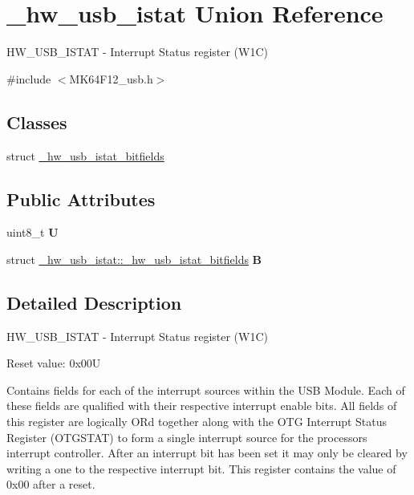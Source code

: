 \hypertarget{union__hw__usb__istat}{}\section{\+\_\+hw\+\_\+usb\+\_\+istat Union Reference}
\label{union__hw__usb__istat}


H\+W\+\_\+\+U\+S\+B\+\_\+\+I\+S\+T\+AT -\/ Interrupt Status register (W1C)  




{\ttfamily \#include $<$M\+K64\+F12\+\_\+usb.\+h$>$}

\subsection*{Classes}
\begin{DoxyCompactItemize}
\item 
struct \hyperlink{struct__hw__usb__istat_1_1__hw__usb__istat__bitfields}{\+\_\+hw\+\_\+usb\+\_\+istat\+\_\+bitfields}
\end{DoxyCompactItemize}
\subsection*{Public Attributes}
\begin{DoxyCompactItemize}
\item 
uint8\+\_\+t {\bfseries U}\hypertarget{union__hw__usb__istat_a45347b87a5b678a1aca003b1258a09ab}{}\label{union__hw__usb__istat_a45347b87a5b678a1aca003b1258a09ab}

\item 
struct \hyperlink{struct__hw__usb__istat_1_1__hw__usb__istat__bitfields}{\+\_\+hw\+\_\+usb\+\_\+istat\+::\+\_\+hw\+\_\+usb\+\_\+istat\+\_\+bitfields} {\bfseries B}\hypertarget{union__hw__usb__istat_a7576e1efca8d8bad9827fb2617d4fbc4}{}\label{union__hw__usb__istat_a7576e1efca8d8bad9827fb2617d4fbc4}

\end{DoxyCompactItemize}


\subsection{Detailed Description}
H\+W\+\_\+\+U\+S\+B\+\_\+\+I\+S\+T\+AT -\/ Interrupt Status register (W1C) 

Reset value\+: 0x00U

Contains fields for each of the interrupt sources within the U\+SB Module. Each of these fields are qualified with their respective interrupt enable bits. All fields of this register are logically OR\textquotesingle{}d together along with the O\+TG Interrupt Status Register (O\+T\+G\+S\+T\+AT) to form a single interrupt source for the processor\textquotesingle{}s interrupt controller. After an interrupt bit has been set it may only be cleared by writing a one to the respective interrupt bit. This register contains the value of 0x00 after a reset. 


